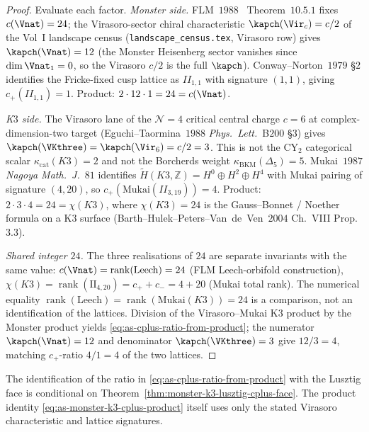 \begin{proof}
Evaluate each factor.
\emph{Monster side.} FLM~$1988$~\cite{FLM88} Theorem~$10.5.1$
fixes $c(\Vnat) = 24$; the Virasoro-sector chiral characteristic
$\kapch(\Vir_c) = c/2$ of the Vol~I landscape census
(\texttt{landscape\_census.tex}, Virasoro row) gives
$\kapch(\Vnat) = 12$ (the Monster Heisenberg sector vanishes
since $\dim \Vnat_1 = 0$, so the Virasoro $c/2$ is the full
$\kapch$). Conway--Norton~$1979$
\S$2$ identifies the Fricke-fixed cusp lattice as $II_{1, 1}$
with signature $(1, 1)$, giving $c_+(II_{1, 1}) = 1$. Product:
$2 \cdot 12 \cdot 1 = 24 = c(\Vnat)$.

\emph{K$3$ side.} The Virasoro lane of the $\mathcal N{=}4$ critical
central charge $c = 6$ at complex-dimension-two target
(Eguchi--Taormina~$1988$ \emph{Phys.\ Lett.}~B$200$ \S$3$) gives
$\kapch(\VKthree)=\kapch(\Vir_6)=c/2 = 3$. This is not the CY$_2$
categorical scalar $\kappa_{\mathrm{cat}}(K3)=2$ and not the
Borcherds weight $\kappa_{\mathrm{BKM}}(\Delta_5)=5$. Mukai~$1987$
\emph{Nagoya Math.\ J.}~$81$ identifies
$\widetilde H(K3, \mathbb Z) = H^0 \oplus H^2 \oplus H^4$
with Mukai pairing of signature $(4, 20)$, so
$c_+(\mathrm{Mukai}(II_{3, 19})) = 4$. Product:
$2 \cdot 3 \cdot 4 = 24 = \chi(K3)$, where
$\chi(K3) = 24$ is the Gauss--Bonnet / Noether formula on a
K$3$ surface (Barth--Hulek--Peters--Van~de~Ven~$2004$ Ch.~VIII
Prop.~$3.3$).

\emph{Shared integer $24$.} The three realisations of $24$ are
separate invariants with the same value:
$c(\Vnat) = \operatorname{rank}(\mathrm{Leech}) = 24$
(FLM Leech-orbifold construction), $\chi(K3) =
\operatorname{rank}(\mathrm{II}_{4, 20}) = c_+ + c_- = 4 + 20$
(Mukai total rank). The numerical equality
$\operatorname{rank}(\mathrm{Leech}) =
\operatorname{rank}(\mathrm{Mukai}(K3)) = 24$ is a comparison, not
an identification of the lattices. Division of the
Virasoro--Mukai K$3$ product by the Monster product yields
\eqref{eq:as-cplus-ratio-from-product}; the numerator
$\kapch(\Vnat) = 12$ and denominator $\kapch(\VKthree) = 3$
give $12/3 = 4$, matching $c_+$-ratio $4/1 = 4$ of
the two lattices.
\end{proof}

\begin{remark}
\label{rem:monster-k3-cplus-lusztig-face-relation}
The identification of the ratio in
\eqref{eq:as-cplus-ratio-from-product} with the Lusztig face is
conditional on Theorem~\ref{thm:monster-k3-lusztig-cplus-face}.  The
product identity \eqref{eq:as-monster-k3-cplus-product} itself uses
only the stated Virasoro characteristic and lattice signatures.
\end{remark}

